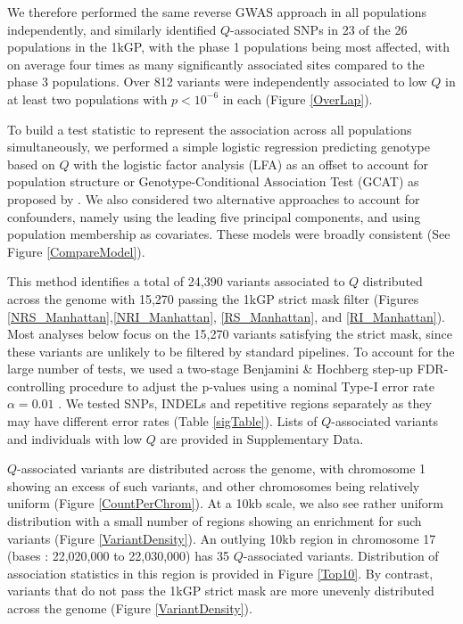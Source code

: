 \documentclass[9pt,article]{template}
\begin{document}
We therefore performed the same reverse GWAS approach in all populations independently, and similarly identified $Q$-associated SNPs in 23 of the 26 populations in the 1kGP, with the phase 1 populations being most affected, with on average four times as many significantly associated sites compared to the phase 3 populations.
Over 812 variants were independently associated to low $Q$ in at least two populations with $ p < 10^{-6}$ in each (Figure \ref{OverLap}).

To build a test statistic to represent the association across all populations simultaneously, we performed a simple logistic regression predicting genotype based on $Q$ with the logistic factor analysis (LFA) as an offset to account for population structure or Genotype-Conditional Association Test  (GCAT) as proposed by \citep{song2015testing}. 
We also considered two alternative approaches to account for confounders, namely using the leading five  principal components, and using population membership as covariates. 
These models were broadly consistent (See Figure \ref{CompareModel}).

This method identifies a total of 24,390 variants associated to $Q$ distributed across the genome with 15,270 passing the 1kGP strict mask filter (Figures \ref{NRS_Manhattan},\ref{NRI_Manhattan}, \ref{RS_Manhattan}, and \ref{RI_Manhattan}). Most analyses below focus on the 15,270 variants satisfying the strict mask, since these variants are unlikely to be filtered by standard pipelines.
To account for the large number of tests, we used a two-stage Benjamini \& Hochberg step-up FDR-controlling procedure to adjust the p-values using a nominal Type-I error rate $\alpha = 0.01$ \citep{Benjamini2006}. 
We tested SNPs, INDELs and repetitive regions separately as they may have different error rates (Table \ref{sigTable}).
Lists of $Q$-associated variants and individuals with low $Q$ are provided in Supplementary Data.

$Q$-associated variants are distributed across the genome, with chromosome 1 showing an excess of such variants, and other chromosomes being relatively uniform (Figure \ref{CountPerChrom}).
At a 10kb scale, we also see rather uniform distribution with a small number of regions showing an enrichment for such variants (Figure \ref{VariantDensity}).
An outlying 10kb region in chromosome 17 (bases : 22,020,000 to  22,030,000) has 35 $Q$-associated variants.
Distribution of association statistics in this region is provided in Figure \ref{Top10}.
By contrast, variants that do not pass the 1kGP strict mask are more unevenly distributed across the genome (Figure \ref{VariantDensity}).
\end{document}
